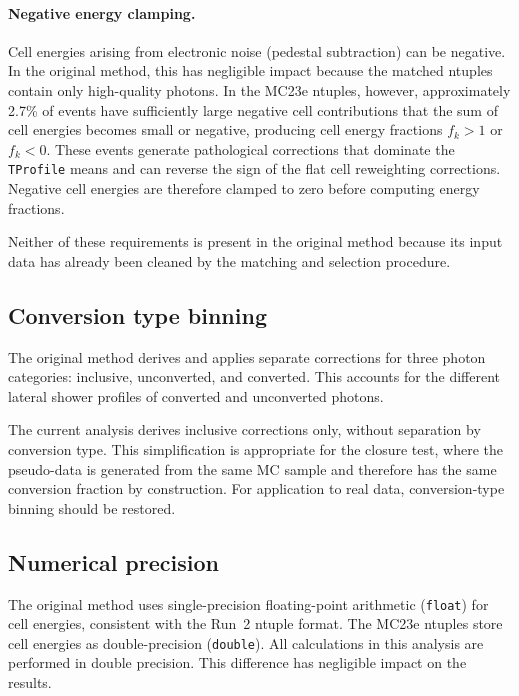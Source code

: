 \documentclass[12pt,a4paper]{article}
\begin{document}
\paragraph{Negative energy clamping.}
Cell energies arising from electronic noise (pedestal subtraction) can be
negative. In the original method, this has negligible impact because
the matched ntuples contain only high-quality photons. In the MC23e ntuples,
however, approximately 2.7\% of events have sufficiently large negative cell
contributions that the sum of cell energies becomes small or negative,
producing cell energy fractions $f_k > 1$ or $f_k < 0$. These events
generate pathological corrections that dominate the \texttt{TProfile} means
and can reverse the sign of the flat cell reweighting corrections. Negative cell energies
are therefore clamped to zero before computing energy fractions.

Neither of these requirements is present in the original method because its
input data has already been cleaned by the matching and selection procedure.

\subsection{Conversion type binning}
\label{sec:adaptations:conversion}

The original method derives and applies separate corrections for three photon
categories: inclusive, unconverted, and converted. This accounts for the
different lateral shower profiles of converted and unconverted photons.

The current analysis derives inclusive corrections only, without separation by
conversion type. This simplification is appropriate for the closure test,
where the pseudo-data is generated from the same MC sample and therefore has
the same conversion fraction by construction. For application to real data,
conversion-type binning should be restored.

\subsection{Numerical precision}
\label{sec:adaptations:precision}

The original method uses single-precision floating-point arithmetic
(\texttt{float}) for cell energies, consistent with the Run~2 ntuple format.
The MC23e ntuples store cell energies as double-precision (\texttt{double}).
All calculations in this analysis are performed in double precision. This
difference has negligible impact on the results.
\end{document}
